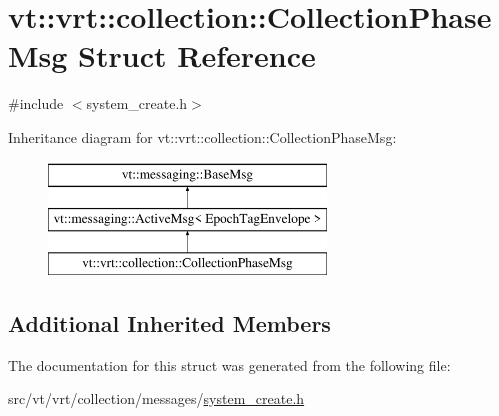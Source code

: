 \hypertarget{structvt_1_1vrt_1_1collection_1_1_collection_phase_msg}{}\section{vt\+:\+:vrt\+:\+:collection\+:\+:Collection\+Phase\+Msg Struct Reference}
\label{structvt_1_1vrt_1_1collection_1_1_collection_phase_msg}


{\ttfamily \#include $<$system\+\_\+create.\+h$>$}

Inheritance diagram for vt\+:\+:vrt\+:\+:collection\+:\+:Collection\+Phase\+Msg\+:\begin{figure}[H]
\begin{center}
\leavevmode
\includegraphics[height=3.000000cm]{structvt_1_1vrt_1_1collection_1_1_collection_phase_msg}
\end{center}
\end{figure}
\subsection*{Additional Inherited Members}


The documentation for this struct was generated from the following file\+:\begin{DoxyCompactItemize}
\item 
src/vt/vrt/collection/messages/\hyperlink{system__create_8h}{system\+\_\+create.\+h}\end{DoxyCompactItemize}
